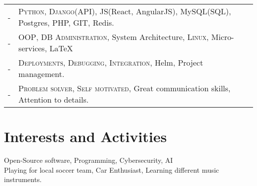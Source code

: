 \documentclass[a4paper,10pt]{article} %
\begin{document}
\begin{tabular}{rl}
- & \textsc{Python, Django(API)}, JS(React, AngularJS), MySQL(SQL), Postgres, PHP, GIT, Redis.\\

- & \textsc{OOP}, \textsc{DB Administration}, System Architecture, \textsc{Linux}, Micro-services, {\sffamily\LaTeX}\setmainfont[SmallCapsFont=Fontin SmallCaps]{Fontin-Regular}\\

- & \textsc{Deployments, Debugging, Integration}, Helm, Project management.\\

- & \textsc{Problem solver, Self motivated}, Great communication skills, Attention to details.\\
\end{tabular}


\section{Interests and Activities}

Open-Source software, Programming, Cybersecurity, AI\\
Playing for local soccer team, Car Enthusiast, Learning different music instruments.




\end{document}
